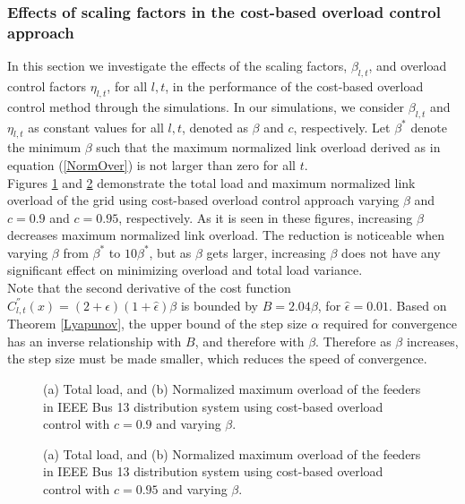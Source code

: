 \documentclass[12pt,draftcls,onecolumn]{IEEEtran}
\begin{document}
\subsubsection{Effects of scaling factors in the cost-based overload control approach}
In this section we investigate the effects of the scaling factors, $\beta_{l,t}$, and overload control factors $\eta_{l,t}$, for all $l,t$, in the performance of the cost-based overload control method through the simulations. In our simulations, we consider $\beta_{l,t}$ and $\eta_{l,t}$ as constant values for all $l,t$, denoted as $\beta$ and $c$, respectively. Let $\beta^*$ denote the minimum $\beta$ such that the maximum normalized link overload derived as in equation (\ref{NormOver}) is not larger than zero for all $t$.\\
\indent Figures \ref{Betac90} and \ref{Betac95} demonstrate the total load and maximum normalized link overload of the grid using cost-based overload control approach varying $\beta$ and $c=0.9$ and $c=0.95$, respectively. As it is seen in these figures, increasing $\beta$ decreases maximum normalized link overload. The reduction is noticeable when varying $\beta$ from $\beta^*$ to $10\beta^*$, but as $\beta$ gets larger, increasing $\beta$ does not have any significant effect on minimizing overload and total load variance.\\
\indent Note that the second derivative of the cost function $C_{l,t}^{''}(x)=(2+\hat{\epsilon})(1+\hat{\epsilon})\beta$ is bounded by $B=2.04\beta$, for $\hat{\epsilon}=0.01$. Based on Theorem \ref{Lyapunov}, the upper bound of the step size $\alpha$ required for convergence has an inverse relationship with $B$, and therefore with $\beta$.  Therefore as $\beta$ increases, the step size must be made smaller, which reduces the speed of convergence.
\begin{figure}[H]
\centering
{}
\caption{(a) Total load, and (b) Normalized maximum overload of the feeders in IEEE Bus 13 distribution system using cost-based overload control with $c=0.9$ and varying $\beta$.}
\label{Betac90}
\end{figure}
\begin{figure}[H]
\centering
{}
\caption{(a) Total load, and (b) Normalized maximum overload of the feeders in IEEE Bus 13 distribution system using cost-based overload control with $c=0.95$ and varying $\beta$.}
\label{Betac95}
\end{figure}
\end{document}
